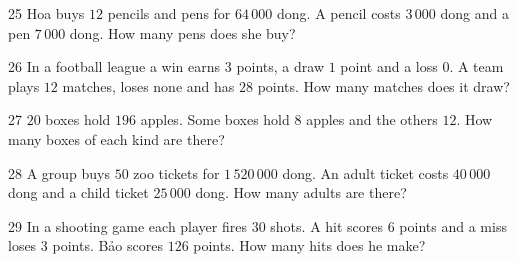 \gap
\begin{probbox}{25}{\relax}
Hoa buys $12$ pencils and pens for $64\,000$ dong. A pencil costs $3\,000$ dong and a pen $7\,000$ dong. How many pens does she buy?
\end{probbox}
\gap
\begin{probbox}{26}{\relax}
In a football league a win earns $3$ points, a draw $1$ point and a loss $0$. A team plays $12$ matches, loses none and has $28$ points. How many matches does it draw?
\end{probbox}
\gap
\begin{probbox}{27}{\relax}
$20$ boxes hold $196$ apples. Some boxes hold $8$ apples and the others $12$. How many boxes of each kind are there?
\end{probbox}
\gap
\begin{probbox}{28}{\relax}
A group buys $50$ zoo tickets for $1\,520\,000$ dong. An adult ticket costs $40\,000$ dong and a child ticket $25\,000$ dong. How many adults are there?
\end{probbox}
\gap
\begin{probbox}{29}{\relax}
In a shooting game each player fires $30$ shots. A hit scores $6$ points and a miss loses $3$ points. Bảo scores $126$ points. How many hits does he make?
\end{probbox}
